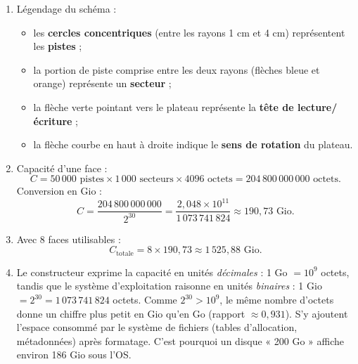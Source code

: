 \documentclass[11pt]{article}
\begin{document}
\begin{corrige}
\begin{enumerate}
    \item Légendage du schéma :
    \begin{itemize}
        \item les \textbf{cercles concentriques} (entre les rayons 1 cm et 4 cm) représentent les \textbf{pistes} ;
        \item la portion de piste comprise entre les deux rayons (flèches bleue et orange) représente un \textbf{secteur} ;
        \item la flèche verte pointant vers le plateau représente la \textbf{tête de lecture/écriture} ;
        \item la flèche courbe en haut à droite indique le \textbf{sens de rotation} du plateau.
    \end{itemize}
    \item Capacité d'une face :
    \[ C = 50\,000 \text{ pistes} \times 1\,000 \text{ secteurs} \times 4096 \text{ octets} = 204\,800\,000\,000 \text{ octets}. \]
    Conversion en Gio :
    \[ C = \frac{204\,800\,000\,000}{2^{30}} = \frac{2,048 \times 10^{11}}{1\,073\,741\,824} \approx 190,73 \text{ Gio}. \]
    \item Avec 8 faces utilisables :
    \[ C_{\text{totale}} = 8 \times 190,73 \approx 1\,525,88 \text{ Gio}. \]
    \item Le constructeur exprime la capacité en unités \emph{décimales} : 1 Go $= 10^{9}$ octets, tandis que le système d'exploitation raisonne en unités \emph{binaires} : 1 Gio $= 2^{30} = 1\,073\,741\,824$ octets. Comme $2^{30} > 10^{9}$, le même nombre d'octets donne un chiffre plus petit en Gio qu'en Go (rapport $\approx 0,931$). S'y ajoutent l'espace consommé par le système de fichiers (tables d'allocation, métadonnées) après formatage. C'est pourquoi un disque « 200 Go » affiche environ 186 Gio sous l'OS.
\end{enumerate}
\end{corrige}
\end{document}
